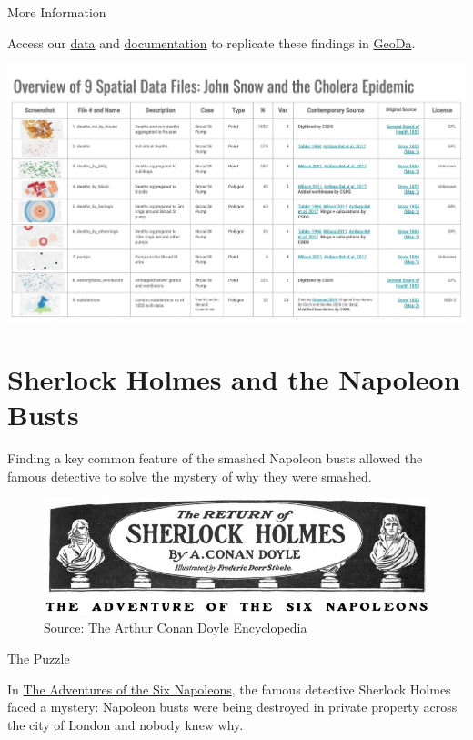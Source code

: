 \documentclass[
]{book}
\begin{document}
More Information

Access our \href{https://geodacenter.github.io/data-and-lab/snow/}{data} and \href{https://geodacenter.github.io/data-and-lab/data/snow_documentation.pdf}{documentation} to replicate these findings in \href{https://geodacenter.github.io}{GeoDa}.

\includegraphics{images/snow8.jpg}

\hypertarget{sherlock-holmes-and-the-napoleon-busts}{%
\section{Sherlock Holmes and the Napoleon Busts}\label{sherlock-holmes-and-the-napoleon-busts}}

Finding a key common feature of the smashed Napoleon busts allowed the famous detective to solve the mystery of why they were smashed.

\begin{figure}
\centering
\includegraphics{images/sherlock1.jpg}
\caption{Source: \href{https://www.arthur-conan-doyle.com/index.php/The_Adventure_of_the_Six_Napoleons}{The Arthur Conan Doyle Encyclopedia}}
\end{figure}

The Puzzle

In \href{https://sherlock-holm.es/stories/pdf/a4/1-sided/sixn.pdf}{The Adventures of the Six Napoleons}, the famous detective Sherlock Holmes faced a mystery: Napoleon busts were being destroyed in private property across the city of London and nobody knew why.
\end{document}
